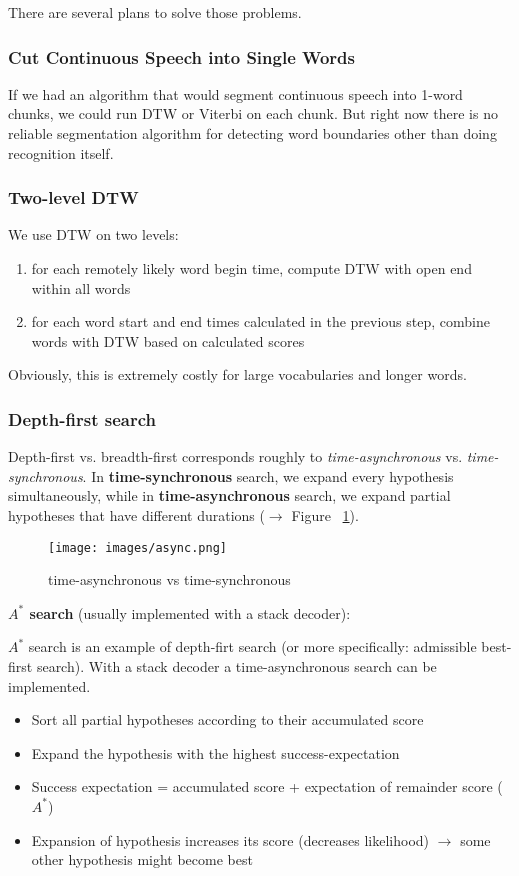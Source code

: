 There are several plans to solve those problems.


\subsubsection{Cut Continuous Speech into Single Words}
If we had an algorithm that would segment continuous speech into 1-word chunks, we could run DTW or Viterbi on each chunk.
But right now there is no reliable segmentation algorithm for detecting word boundaries other than doing recognition itself.

\subsubsection{Two-level DTW}
We use DTW on two levels:
\begin{enumerate}
    \item for each remotely likely word begin time, compute DTW with open end within all words
    \item for each word start and end times calculated in the previous step, combine words with DTW based on calculated scores
\end{enumerate}

Obviously, this is extremely costly for large vocabularies and longer words.

\subsubsection{Depth-first search}

Depth-first vs. breadth-first corresponds roughly to \textit{time-asynchronous} vs. \textit{time-synchronous}.
In \textbf{time-synchronous} search, we expand every hypothesis simultaneously, while in \textbf{time-asynchronous} search, we expand partial hypotheses that have different durations ($\to$ Figure ~\ref{fig:SyncVsAsync}).

\begin{figure}[htb]
\centering
\texttt{[image: images/async.png]}
\caption{\label{fig:SyncVsAsync} time-asynchronous vs time-synchronous}
\end{figure}

\textbf{$A^{\ast}$ search} (usually implemented with a stack decoder):

$A^{\ast}$ search is an example of depth-firt search (or more specifically: admissible best-first search).
With a stack decoder a time-asynchronous search can be implemented. 
\begin{itemize}
\item Sort all partial hypotheses according to their accumulated score
\item Expand the hypothesis with the highest success-expectation
\item Success expectation = accumulated score + expectation of remainder score ($A^{\ast}$)
\item Expansion of hypothesis increases its score (decreases likelihood) $\rightarrow$ some other hypothesis might become best
\end{itemize}

